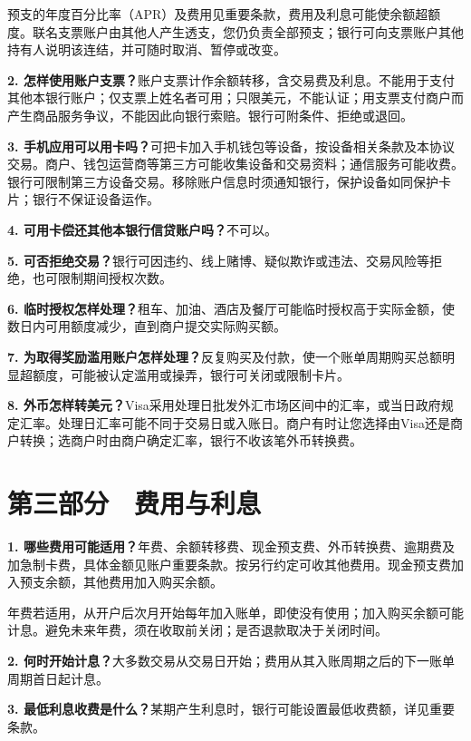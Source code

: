 \documentclass[UTF8,fontset=none,11pt,a4paper]{ctexart}
\begin{document}
预支的年度百分比率（APR）及费用见重要条款，费用及利息可能使余额超额度。联名支票账户由其他人产生透支，您仍负责全部预支；银行可向支票账户其他持有人说明该连结，并可随时取消、暂停\allowbreak\mbox{或改变。}


\textbf{2. 怎样使用账户支票？}账户支票计作余额转移，含交易费及利息。不能用于支付其他本银行账户；仅支票上姓名者可用；只限美元，不能认证；用支票支付商户而产生商品服务争议，不能因此向银行索赔。银行可附条件、拒\allowbreak\mbox{绝或退回。}


\textbf{3. 手机应用可以用卡吗？}可把卡加入手机钱包等设备，按设备相关条款及本协议交易。商户、钱包运营商等第三方可能收集设备和交易资料；通信服务可能收费。银行可限制第三方设备交易。移除账户信息时须通知银行，保护设备如同保护卡片；银行不保证\allowbreak\mbox{设备运作。}


\textbf{4. 可用卡偿还其他本银行信贷账户吗？}不可以。


\textbf{5. 可否拒绝交易？}银行可因违约、线上赌博、疑似欺诈或违法、交易风险等拒绝，也可限制期间\allowbreak\mbox{授权次数。}


\textbf{6. 临时授权怎样处理？}租车、加油、酒店及餐厅可能临时授权高于实际金额，使数日内可用额度减少，直到商户提交实\allowbreak\mbox{际购买额。}


\textbf{7. 为取得奖励滥用账户怎样处理？}反复购买及付款，使一个账单周期购买总额明显超额度，可能被认定滥用或操弄，银行可关闭或\allowbreak\mbox{限制卡片。}


\textbf{8. 外币怎样转美元？}Visa采用处理日批发外汇市场区间中的汇率，或当日政府规定汇率。处理日汇率可能不同于交易日或入账日。商户有时让您选择由Visa还是商户转换；选商户时由商户确定汇率，银行不收该笔外\allowbreak\mbox{币转换费。}


\section*{第三部分　费用与利息}
\textbf{1. 哪些费用可能适用？}年费、余额转移费、现金预支费、外币转换费、逾期费及加急制卡费，具体金额见账户重要条款。按另行约定可收其他费用。现金预支费加入预支余额，其他费用加入\allowbreak\mbox{购买余额。}


年费若适用，从开户后次月开始每年加入账单，即使没有使用；加入购买余额可能计息。避免未来年费，须在收取前关闭；是否退款取决于\allowbreak\mbox{关闭时间。}


\textbf{2. 何时开始计息？}大多数交易从交易日开始；费用从其入账周期之后的下一账单周期首\allowbreak\mbox{日起计息。}


\textbf{3. 最低利息收费是什么？}某期产生利息时，银行可能设置最低收费额，详见\allowbreak\mbox{重要条款。}
\end{document}
